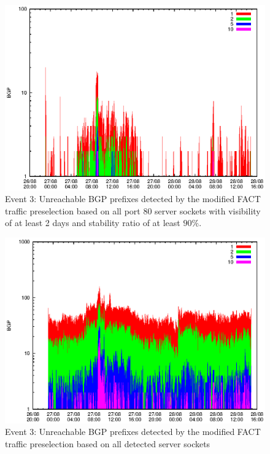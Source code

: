 \begin{figure}
	[p] \centering 
	\includegraphics[width=0.75\linewidth]{images/events/2010_08_27/bgp_log_port80_Set_stab_9_vts_2.eps} \caption{Event 3: Unreachable BGP prefixes detected by the modified FACT traffic preselection based on all port 80 server sockets with visibility of at least 2 days and stability ratio of at least $90\%$.} 
	\label{fig:RIPE_FACT_allSES80VTS2STAB9} 
\end{figure}
\begin{figure}
	[p] \centering 
	\includegraphics[width=0.75\linewidth]{images/events/2010_08_27/bgp_log_all_external.eps} \caption{Event 3: Unreachable BGP prefixes detected by the modified FACT traffic preselection based on all detected server sockets} 
	\label{fig:RIPE_FACT_allSES} 
\end{figure}
